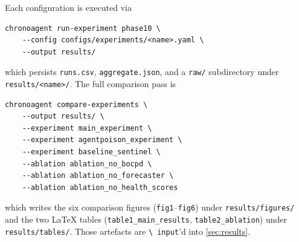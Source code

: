 Each configuration is executed via
\begin{verbatim}
chronoagent run-experiment phase10 \
    --config configs/experiments/<name>.yaml \
    --output results/
\end{verbatim}
which persists \texttt{runs.csv}, \texttt{aggregate.json}, and a
\texttt{raw/} subdirectory under \texttt{results/<name>/}. The full
comparison pass is
\begin{verbatim}
chronoagent compare-experiments \
    --output results/ \
    --experiment main_experiment \
    --experiment agentpoison_experiment \
    --experiment baseline_sentinel \
    --ablation ablation_no_bocpd \
    --ablation ablation_no_forecaster \
    --ablation ablation_no_health_scores
\end{verbatim}
which writes the six comparison figures (\texttt{fig1}--\texttt{fig6})
under \texttt{results/figures/} and the two LaTeX tables
(\texttt{table1\_main\_results}, \texttt{table2\_ablation}) under
\texttt{results/tables/}. Those artefacts are \texttt{\textbackslash
input}'d into \cref{sec:results}.
